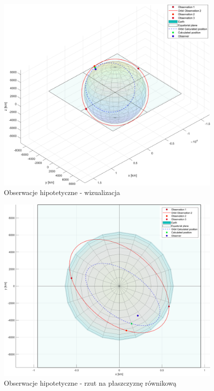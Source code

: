     \begin{figure}[h]
    \centering
    \includegraphics[width=\textwidth]{tex/img/anomaly82.png}
    \caption{Obserwacje hipotetyczne - wizualizacja}
    \label{fig:hipotetyczne-1}
    \end{figure}
    
    \begin{figure}[h]
    \centering
    \includegraphics[width=\textwidth]{tex/img/anomaly82_rownikowa.png}
    \caption{Obserwacje hipotetyczne - rzut na płaszczyznę równikową}
    \label{fig:hipotetyczne-2}
    \end{figure}


